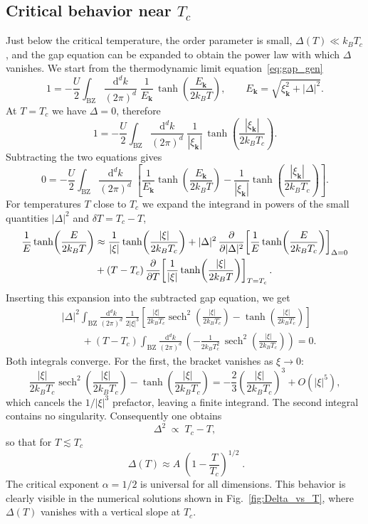 \documentclass[11pt,a4paper,twoside,openany]{report}
\begin{document}
\subsection{Critical behavior near $T_c$}

Just below the critical temperature, the order parameter is small, \(\Delta(T)\ll k_B T_c\), and the gap equation can be expanded to obtain the power law with which \(\Delta\) vanishes.  We start from the thermodynamic limit equation~\eqref{eq:gap_gen}
\[
1 = -\frac{U}{2} \int_{\mathrm{BZ}}\!\frac{\mathrm{d}^{d}k}{(2\pi)^{d}}\;
\frac{1}{E_{\mathbf{k}}}\,\tanh\!\left(\frac{E_{\mathbf{k}}}{2k_B T}\right),
\qquad E_{\mathbf{k}}=\sqrt{\xi_{\mathbf{k}}^2+|\Delta|^2}.
\]
At \(T=T_c\) we have \(\Delta=0\), therefore
\[
1 = -\frac{U}{2} \int_{\mathrm{BZ}}\!\frac{\mathrm{d}^{d}k}{(2\pi)^{d}}\;
\frac{1}{|\xi_{\mathbf{k}}|}\,\tanh\!\left(\frac{|\xi_{\mathbf{k}}|}{2k_B T_c}\right).
\]
Subtracting the two equations gives
\[
0 = -\frac{U}{2} \int_{\mathrm{BZ}}\!\frac{\mathrm{d}^{d}k}{(2\pi)^{d}}\;
\left[ \frac{1}{E_{\mathbf{k}}}\tanh\!\left(\frac{E_{\mathbf{k}}}{2k_B T}\right) -
\frac{1}{|\xi_{\mathbf{k}}|}\tanh\!\left(\frac{|\xi_{\mathbf{k}}|}{2k_B T_c}\right) \right].
\]
For temperatures \(T\) close to \(T_c\) we expand the integrand in powers of the small quantities \(|\Delta|^2\) and \(\delta T=T_c-T\),
\begin{align}
\frac{1}{E}\tanh\!\left(\frac{E}{2k_B T}\right) &\approx
\frac{1}{|\xi|}\tanh\!\left(\frac{|\xi|}{2k_B T_c}\right)
+ |\Delta|^2 \,\frac{\partial}{\partial|\Delta|^2}\!\left[ \frac{1}{E}\tanh\!\left(\frac{E}{2k_B T_c}\right)\right]_{\Delta=0}\notag\\
&+ (T-T_c)\,\frac{\partial}{\partial T}\!\left[ \frac{1}{|\xi|}\tanh\!\left(\frac{|\xi|}{2k_B T}\right)\right]_{T=T_c}.
\end{align}
Inserting this expansion into the subtracted gap equation, we get
\begin{align*}
&|\Delta|^2 \int_{\mathrm{BZ}}\!\frac{\mathrm{d}^{d}k}{(2\pi)^{d}}\,
\frac{1}{2|\xi|^3}\left[ \frac{|\xi|}{2k_B T_c}\operatorname{sech}^2\!\left(\frac{|\xi|}{2k_B T_c}\right) - \tanh\!\left(\frac{|\xi|}{2k_B T_c}\right) \right] \nonumber\\
&\qquad + (T-T_c)\int_{\mathrm{BZ}}\!\frac{\mathrm{d}^{d}k}{(2\pi)^{d}}\,
\left( -\frac{1}{2k_B T_c^2}\,\operatorname{sech}^2\!\left(\frac{|\xi|}{2k_B T_c}\right) \right) = 0 . \label{eq:expanded}
\end{align*}
Both integrals converge.  For the first, the bracket vanishes as $\xi\to0$:
\[
\frac{|\xi|}{2k_B T_c}\operatorname{sech}^2\!\left(\frac{|\xi|}{2k_B T_c}\right) - \tanh\!\left(\frac{|\xi|}{2k_B T_c}\right)
= -\frac{2}{3}\left(\frac{|\xi|}{2k_B T_c}\right)^3 + O(|\xi|^5),
\]
which cancels the $1/|\xi|^3$ prefactor, leaving a finite integrand. The second integral contains no singularity. Consequently one obtains
\[
\Delta^2 \;\propto\; T_c - T ,
\]
so that for \(T\lesssim T_c\)
\[
\boxed{\;\Delta(T) \approx A\; \left(1-\frac{T}{T_c}\right)^{1/2}\;}.
\]
The critical exponent \(\alpha = 1/2\) is universal for all dimensions. This behavior is clearly visible in the numerical solutions shown in Fig.~\ref{fig:Delta_vs_T}, where \(\Delta(T)\) vanishes with a vertical slope at \(T_c\).
\end{document}
